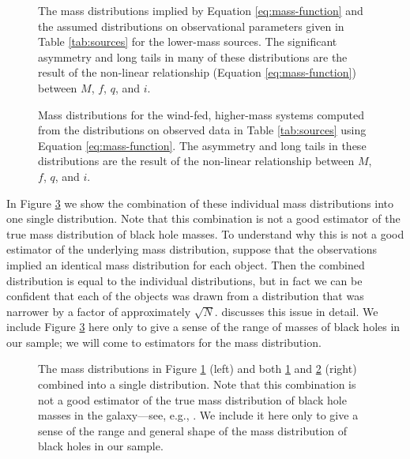 \documentclass[preprint]{aastex}
\begin{document}
\begin{figure}
  \begin{center}
  \end{center}

  \caption{\label{fig:low-masses} The mass distributions implied by
    Equation \eqref{eq:mass-function} and the assumed distributions on
    observational parameters given in Table \ref{tab:sources} for the
    lower-mass sources.  The significant asymmetry and long tails in
    many of these distributions are the result of the non-linear
    relationship (Equation \eqref{eq:mass-function}) between $M$, $f$,
    $q$, and $i$.}
\end{figure}

\begin{figure}
  \begin{center}
  \end{center}
  \caption{\label{fig:high-masses} Mass distributions for the
    wind-fed, higher-mass systems computed from the distributions on
    observed data in Table \ref{tab:sources} using Equation
    \eqref{eq:mass-function}.  The asymmetry and long tails in these
    distributions are the result of the non-linear relationship
    between $M$, $f$, $q$, and $i$.}
\end{figure}

In Figure \ref{fig:masses} we show the combination of these individual
mass distributions into one single distribution.  Note that this
combination is not a good estimator of the true mass distribution of
black hole masses.  To understand why this is not a good estimator of
the underlying mass distribution, suppose that the observations
implied an identical mass distribution for each object.  Then the
combined distribution is equal to the individual distributions, but in
fact we can be confident that each of the objects was drawn from a
distribution that was narrower by a factor of approximately
$\sqrt{N}$.  \citet{Mandel2010} discusses this issue in detail.  We
include Figure \ref{fig:masses} here only to give a sense of the range
of masses of black holes in our sample; we will come to estimators for
the mass distribution.

\begin{figure}

  \caption{\label{fig:masses} The mass distributions in Figure
    \ref{fig:low-masses} (left) and both \ref{fig:low-masses} and
    \ref{fig:high-masses} (right) combined into a single
    distribution. Note that this combination is not a good estimator
    of the true mass distribution of black hole masses in the
    galaxy---see, e.g., \citet{Mandel2010}.  We include it here only
    to give a sense of the range and general shape of the mass
    distribution of black holes in our sample.}
\end{figure}
\end{document}
